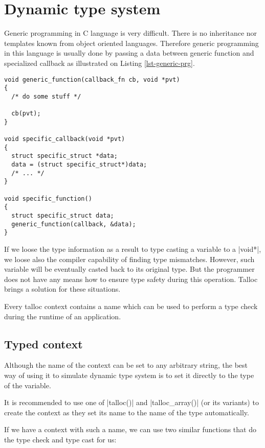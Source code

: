 \section{Dynamic type system}
\label{talloc:dyn-ts}

Generic programming in C language is very difficult. There is no inheritance nor
templates known from object oriented languages. Therefore generic programming in
this language is usually done by passing a data between generic function and
specialized callback as illustrated on Listing \ref{lst-generic-prg}.

\begin{lstlisting}[caption={Generic programming pattern},label=lst-generic-prg]
void generic_function(callback_fn cb, void *pvt)
{
  /* do some stuff */
  
  cb(pvt);
}

void specific_callback(void *pvt)
{
  struct specific_struct *data;
  data = (struct specific_struct*)data;
  /* ... */
}

void specific_function()
{
  struct specific_struct data;
  generic_function(callback, &data);
}
\end{lstlisting}

If we loose the type information as a result to type casting a variable to a
|void*|, we loose also the compiler capability of finding type mismatches.
However, such variable will be eventually casted back to its original type. But
the programmer does not have any means how to ensure type safety during this
operation. Talloc brings a solution for these situations.

Every talloc context contains a name which can be used to perform a type check
during the runtime of an application. 

\subsection{Typed context}

Although the name of the context can be set to any arbitrary string, the best
way of using it to simulate dynamic type system is to set it directly to the
type of the variable.

It is recommended to use one of |talloc()| and |talloc_array()| (or its
variants) to create the context as they set its name to the name of the type
automatically.

If we have a context with such a name, we can use two similar functions that do
the type check and type cast for us:

